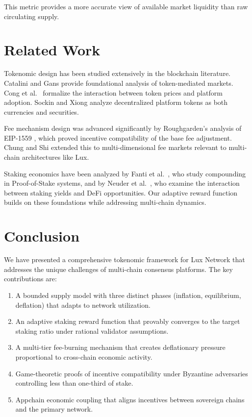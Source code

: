 \documentclass[11pt,a4paper]{article}
\begin{document}
This metric provides a more accurate view of available market liquidity than raw circulating supply.

\section{Related Work}\label{sec:related}

Tokenomic design has been studied extensively in the blockchain literature. Catalini and Gans \cite{catalini2016} provide foundational analysis of token-mediated markets. Cong et al.\ \cite{cong2021tokenomics} formalize the interaction between token prices and platform adoption. Sockin and Xiong \cite{sockin2023} analyze decentralized platform tokens as both currencies and securities.

Fee mechanism design was advanced significantly by Roughgarden's analysis of EIP-1559 \cite{roughgarden2020eip1559}, which proved incentive compatibility of the base fee adjustment. Chung and Shi \cite{chung2023} extended this to multi-dimensional fee markets relevant to multi-chain architectures like Lux.

Staking economics have been analyzed by Fanti et al.\ \cite{fanti2019economics}, who study compounding in Proof-of-Stake systems, and by Neuder et al.\ \cite{neuder2021}, who examine the interaction between staking yields and DeFi opportunities. Our adaptive reward function builds on these foundations while addressing multi-chain dynamics.

\section{Conclusion}\label{sec:conclusion}

We have presented a comprehensive tokenomic framework for Lux Network that addresses the unique challenges of multi-chain consensus platforms. The key contributions are:

\begin{enumerate}
    \item A bounded supply model with three distinct phases (inflation, equilibrium, deflation) that adapts to network utilization.
    \item An adaptive staking reward function that provably converges to the target staking ratio under rational validator assumptions.
    \item A multi-tier fee-burning mechanism that creates deflationary pressure proportional to cross-chain economic activity.
    \item Game-theoretic proofs of incentive compatibility under Byzantine adversaries controlling less than one-third of stake.
    \item Appchain economic coupling that aligns incentives between sovereign chains and the primary network.
\end{enumerate}
\end{document}
